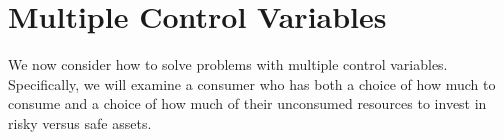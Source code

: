 \documentclass[titlepage, headings=optiontotocandhead]{econtex}
\begin{document}

\hypertarget{multiple-control-variables}{}
\section{Multiple Control Variables}\label{sec:multiple-control-variables}
We now consider how to solve problems with multiple control variables.  Specifically, we will examine a consumer who has both a choice of how much to consume and a choice of how much of their unconsumed resources to invest in risky versus safe assets.
\end{document}
